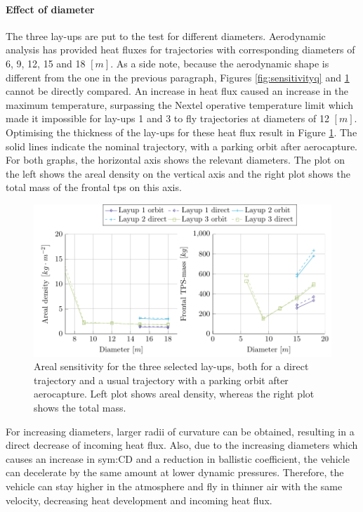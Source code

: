 \paragraph{Effect of diameter}
The three lay-ups are put to the test for different diameters. Aerodynamic analysis has provided heat fluxes for trajectories with corresponding diameters of 6, 9, 12, 15 and 18 $\left[ m \right]$. As a side note, because the aerodynamic shape is different from the one in the previous paragraph, Figures \ref{fig:sensitivityq} and \ref{fig:sensitivityA} cannot be directly compared. An increase in heat flux caused an increase in the maximum temperature, surpassing the Nextel operative temperature limit which made it impossible for lay-ups 1 and 3 to fly trajectories at diameters of 12 $\left[ m \right]$. Optimising the thickness of the lay-ups for these heat flux result in Figure \ref{fig:sensitivityA}. The solid lines indicate the nominal trajectory, with a parking orbit after aerocapture. For both graphs, the horizontal axis shows the relevant diameters. The plot on the left shows the areal density on the vertical axis and the right plot shows the total mass of the frontal \gls{tps} on this axis.

\begin{figure}[h]
	\centering
	\includegraphics{./Figure/Thermal/SensitivityA.pdf}
	\caption[Areal sensitivity for the three selected lay-ups]{Areal sensitivity for the three selected lay-ups, both for a direct trajectory and a usual trajectory with a parking orbit after aerocapture. Left plot shows areal density, whereas the right plot shows the total mass.}
	\label{fig:sensitivityA}
\end{figure}

For increasing diameters, larger radii of curvature can be obtained, resulting in a direct decrease of incoming heat flux. Also, due to the increasing diameters which causes an increase in \gls{sym:CD} and a reduction in ballistic coefficient, the vehicle can decelerate by the same amount at lower dynamic pressures. Therefore, the vehicle can stay higher in the atmosphere and fly in thinner air with the same velocity, decreasing heat development and incoming heat flux.\\

